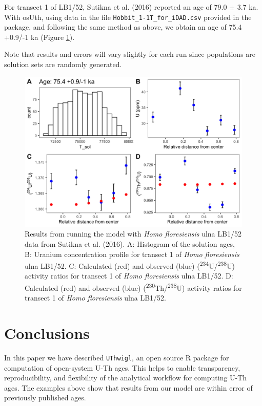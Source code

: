 \documentclass[]{elsarticle} %
\begin{document}
For transect 1 of LB1/52, Sutikna et al. (2016) reported an age of 79.0 \(\pm\) 3.7 ka. With osUth, using data in the file \texttt{Hobbit\_1-1T\_for\_iDAD.csv} provided in the package, and following the same method as above, we obtain an age of 75.4 +0.9/-1 ka (Figure \ref{fig:plot-panel-hobbit-fig}).

Note that results and errors will vary slightly for each run since populations are solution sets are randomly generated.

\newpage



\begin{figure}
\includegraphics[width=0.95\linewidth]{figures/plot-panel-hobbit} \caption{Results from running the model with \emph{Homo floresiensis} ulna LB1/52 data from Sutikna et al. (2016). A: Histogram of the solution ages, B: Uranium concentration profile for transect 1 of \emph{Homo floresiensis} ulna LB1/52. C: Calculated (red) and observed (blue) (\textsuperscript{234}U/\textsuperscript{238}U) activity ratios for transect 1 of \emph{Homo floresiensis} ulna LB1/52. D: Calculated (red) and observed (blue) (\textsuperscript{230}Th/\textsuperscript{238}U) activity ratios for transect 1 of \emph{Homo floresiensis} ulna LB1/52.}\label{fig:plot-panel-hobbit-fig}
\end{figure}

\FloatBarrier

\hypertarget{conclusions}{%
\section{Conclusions}\label{conclusions}}

In this paper we have described \texttt{UThwigl}, an open source R package for computation of open-system U-Th ages. This helps to enable transparency, reproducibility, and flexibility of the analytical workflow for computing U-Th ages. The examples above show that results from our model are within error of previously published ages.
\end{document}
